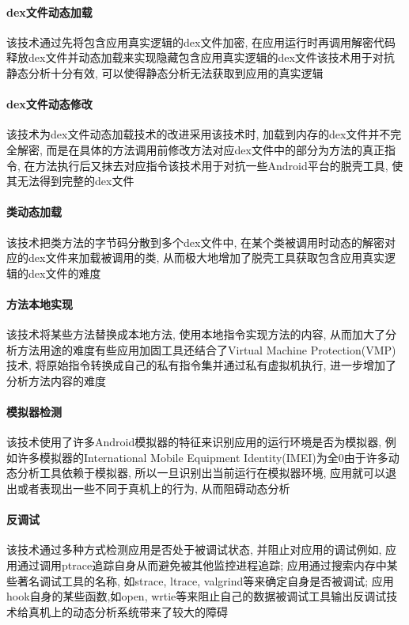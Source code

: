 \paragraph*{dex文件动态加载}
该技术通过先将包含应用真实逻辑的dex文件加密, 在应用运行时再调用解密代码释放dex文件并动态加载来实现隐藏包含应用真实逻辑的dex文件\juhao 该技术用于对抗静态分析十分有效, 可以使得静态分析无法获取到应用的真实逻辑\juhao

\paragraph*{dex文件动态修改}
该技术为dex文件动态加载技术的改进\juhao 采用该技术时, 加载到内存的dex文件并不完全解密, 而是在具体的方法调用前修改方法对应dex文件中的部分为方法的真正指令, 在方法执行后又抹去对应指令\juhao 该技术用于对抗一些Android平台的脱壳工具, 使其无法得到完整的dex文件\juhao

\paragraph*{类动态加载}
该技术把类方法的字节码分散到多个dex文件中, 在某个类被调用时动态的解密对应的dex文件来加载被调用的类, 从而极大地增加了脱壳工具获取包含应用真实逻辑的dex文件的难度\juhao

\paragraph*{方法本地实现}
该技术将某些方法替换成本地方法, 使用本地指令实现方法的内容, 从而加大了分析方法用途的难度\juhao 有些应用加固工具还结合了Virtual Machine Protection(VMP)技术, 将原始指令转换成自己的私有指令集并通过私有虚拟机执行, 进一步增加了分析方法内容的难度\juhao

\paragraph*{模拟器检测}
该技术使用了许多Android模拟器的特征来识别应用的运行环境是否为模拟器, 例如许多模拟器的International Mobile Equipment Identity(IMEI)为全0\juhao 由于许多动态分析工具依赖于模拟器, 所以一旦识别出当前运行在模拟器环境, 应用就可以退出或者表现出一些不同于真机上的行为, 从而阻碍动态分析\juhao

\paragraph*{反调试}
该技术通过多种方式检测应用是否处于被调试状态, 并阻止对应用的调试\juhao 例如, 应用通过调用ptrace追踪自身从而避免被其他监控进程追踪; 应用通过搜索内存中某些著名调试工具的名称, 如strace, ltrace, valgrind等来确定自身是否被调试; 应用hook自身的某些函数,如open, wrtie等来阻止自己的数据被调试工具输出\juhao 反调试技术给真机上的动态分析系统带来了较大的障碍\juhao




